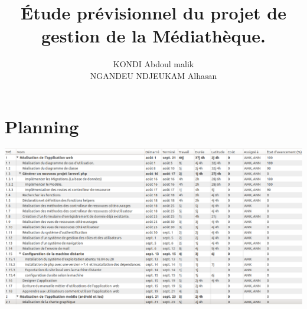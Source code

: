 \documentclass[12pt,a4paper]{article}
\author{KONDI Abdoul malik \\ NGANDEU NDJEUKAM Alhasan}
\title{Étude prévisionnel du projet de gestion de la Médiathèque.}
\begin{document}
\maketitle
\tableofcontents
\newpage

\section{Planning}

\begin{center}
\includegraphics[scale=0.43]{images/taches.png}
\end{center}

\newpage
\end{document}
